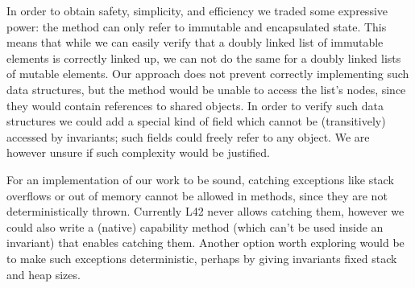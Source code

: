 In order to obtain safety, simplicity, and efficiency we traded some expressive power:
the \Q@invariant@ method can only refer to immutable and encapsulated state.
This means that while we can easily verify that a doubly linked list of immutable elements
is correctly linked up,
we can not do the same for a doubly linked lists of mutable elements. Our approach does not prevent correctly implementing such data structures, but the \Q@invariant@ method would be unable to access the list's nodes, since they would contain \Q@mut@ references to shared objects.
In order to verify such data structures we could add a special kind of field which cannot be (transitively) accessed by invariants; such fields could freely refer to any object. We are however unsure if such complexity would be justified.





For an implementation of our work to be sound, catching exceptions like stack overflows or out of memory
cannot be allowed in \Q@invariant@ methods, since they are not deterministically thrown.
Currently L42 never allows catching them, however we could also write a (native) capability method (which can't be used inside an invariant) that enables catching them. Another option worth exploring would be to make such exceptions deterministic, perhaps by giving invariants fixed stack and heap sizes.

